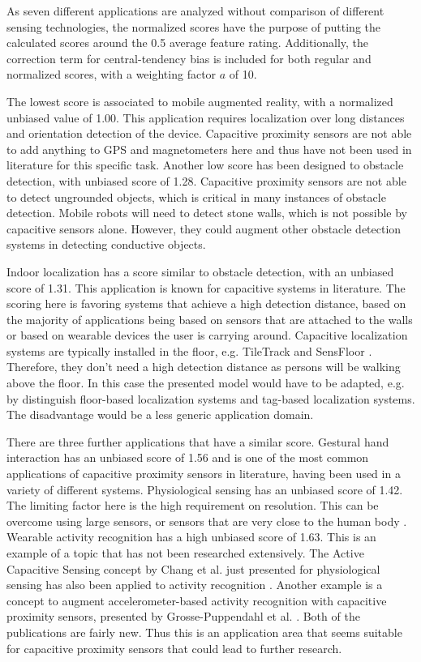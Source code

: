 As seven different applications are analyzed without comparison of different sensing technologies, the normalized scores have the purpose of putting the calculated scores around the 0.5 average feature rating. Additionally, the correction term for central-tendency bias is included for both regular and normalized scores, with a weighting factor $a$ of 10.

The lowest score is associated to mobile augmented reality, with a normalized unbiased value of 1.00. This application requires localization over long distances and orientation detection of the device. Capacitive proximity sensors are not able to add anything to GPS and magnetometers here and thus have not been used in literature for this specific task. Another low score has been designed to obstacle detection, with unbiased score of 1.28. Capacitive proximity sensors are not able to detect ungrounded objects, which is critical in many instances of obstacle detection. Mobile robots will need to detect stone walls, which is not possible by capacitive sensors alone. However, they could augment other obstacle detection systems in detecting conductive objects. 

Indoor localization has a score similar to obstacle detection, with an unbiased score of 1.31. This application is known for capacitive systems in literature. The scoring here is favoring systems that achieve a high detection distance, based on the majority of applications being based on sensors that are attached to the walls or based on wearable devices the user is carrying around. Capacitive localization systems are typically installed in the floor, e.g. TileTrack \cite{Valtonen2009a} and SensFloor \cite{lauterbach2009}. Therefore, they don't need a high detection distance as persons will be walking above the floor. In this case the presented model would have to be adapted, e.g. by distinguish floor-based localization systems and tag-based localization systems. The disadvantage would be a less generic application domain.

There are three further applications that have a similar score. Gestural hand interaction has an unbiased score of 1.56 and is one of the most common applications of capacitive proximity sensors in literature, having been used in a variety of different systems. Physiological sensing has an unbiased score of 1.42. The limiting factor here is the high requirement on resolution. This can be overcome using large sensors, or sensors that are very close to the human body \cite{cheng2010active}. Wearable activity recognition has a high unbiased score of 1.63. This is an example of a topic that has not been researched extensively. The Active Capacitive Sensing concept by Chang et al. just presented for physiological sensing has also been applied to activity recognition \cite{cheng2010active}. Another example is a concept to augment accelerometer-based activity recognition with capacitive proximity sensors, presented by Grosse-Puppendahl et al. \cite{grosse2012enhancing}. Both of the publications are fairly new. Thus this is an application area that seems suitable for capacitive proximity sensors that could lead to further research.

